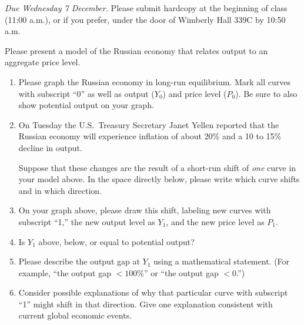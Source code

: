 \documentclass{assignment}
\date{Friday 2 December 2022}
\begin{document}
\RaggedRight

\beginassignment{}

\emph{Due Wednesday 7 December.} Please submit hardcopy at the beginning of class (11:00 a.m.), or if you prefer, under the door of Wimberly Hall 339C by 10:50 a.m.

\ornamentalrule

Please present a model of the Russian economy that relates output to an aggregate price level.

\begin{enumerate}

\item Please graph the Russian economy in long-run equilibrium. Mark all curves with subscript ``0'' as well as output ($Y_0$) and price level ($P_0$). Be sure to also show potential output on your graph.

\vfill

\item On Tuesday the U.S.~Treasury Secretary Janet Yellen reported that the Russian economy will experience inflation of about 20\% and a 10 to 15\% decline in output.

Suppose that these changes are the result of a short-run shift of \emph{one} curve in your model above. In the space directly below, please write which curve shifts and in which direction.

\vspace{3.0\baselineskip}

\clearpage

\item On your graph above, please draw this shift, labeling new curves with subscript ``1,'' the new output level as $Y_1$, and the new price level as $P_1$.

\item Is $Y_1$ above, below, or equal to potential output?

\vspace{3.0\baselineskip}

\item Please describe the output gap at $Y_1$ using a mathematical statement. (For example, ``the output gap $<100\%$'' or ``the output gap $<0$.'')

\vspace{4.0\baselineskip}

\item Consider possible explanations of why that particular curve with subscript ``1'' might shift in that direction. Give one explanation consistent with current global economic events.


\end{enumerate}
\end{document}
